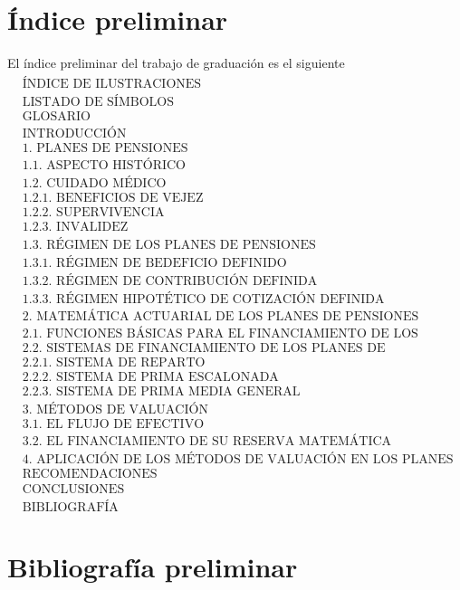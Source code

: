 \documentclass[12pt,letterpaper,titlepage]{article}
\begin{document}
\section{Índice preliminar}
El índice preliminar del trabajo de graduación es el siguiente
\begin{align*}
&\text{ÍNDICE DE ILUSTRACIONES}\\
&\text{LISTADO DE SÍMBOLOS}\\
&\text{GLOSARIO}\\
&\text{INTRODUCCIÓN}\\
&\text{1. PLANES DE PENSIONES}\\
&\text{1.1. ASPECTO HISTÓRICO }\\
&\text{1.2. CUIDADO MÉDICO }\\
&\text{1.2.1. BENEFICIOS DE VEJEZ}\\
&\text{1.2.2. SUPERVIVENCIA}\\
&\text{1.2.3. INVALIDEZ }\\
&\text{1.3. RÉGIMEN DE LOS PLANES DE PENSIONES}\\
&\text{1.3.1. RÉGIMEN DE BEDEFICIO DEFINIDO}\\
&\text{1.3.2. RÉGIMEN DE CONTRIBUCIÓN DEFINIDA}\\
&\text{1.3.3. RÉGIMEN HIPOTÉTICO DE COTIZACIÓN DEFINIDA}\\
&\text{2. MATEMÁTICA ACTUARIAL DE LOS PLANES DE PENSIONES}\\
&\text{2.1. FUNCIONES BÁSICAS PARA EL FINANCIAMIENTO DE LOS PLANES DE PENSIONES}\\
&\text{2.2. SISTEMAS DE FINANCIAMIENTO DE LOS PLANES DE PENSIONES}\\
&\text{2.2.1. SISTEMA DE REPARTO}\\
&\text{2.2.2. SISTEMA DE PRIMA ESCALONADA}\\
&\text{2.2.3. SISTEMA DE PRIMA MEDIA GENERAL}\\
&\text{3. MÉTODOS DE VALUACIÓN}\\
&\text{3.1. EL FLUJO DE EFECTIVO}\\
&\text{3.2. EL FINANCIAMIENTO DE SU RESERVA MATEMÁTICA }\\
&\text{4. APLICACIÓN DE LOS MÉTODOS DE VALUACIÓN EN LOS PLANES DE PENSIONES}\\
&\text{RECOMENDACIONES}\\
&\text{CONCLUSIONES}\\
&\text{BIBLIOGRAFÍA} 
\end{align*}

\newpage

\section{Bibliografía preliminar}


\label{fin}
\end{document}
